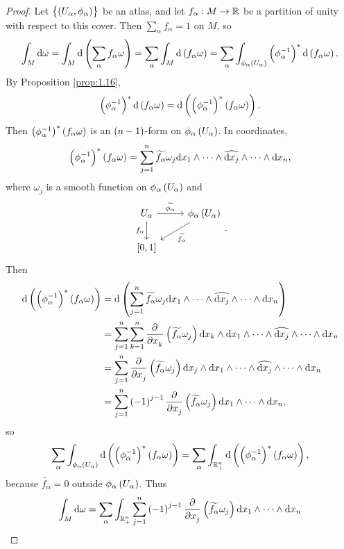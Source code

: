 \begin{proof}
Let $ \cbr{\br{U_\alpha, \phi_\alpha}} $ be an atlas, and let $ f_\alpha : M \to \mathbb{R} $ be a partition of unity with respect to this cover. Then $ \sum_\alpha f_\alpha = 1 $ on $ M $, so
$$ \int_M \d\omega = \int_M \d\br{\sum_\alpha f_\alpha\omega} = \sum_\alpha \int_M \d\br{f_\alpha\omega} = \sum_\alpha \int_{\phi_\alpha\br{U_\alpha}} \br{\phi_\alpha^{-1}}^*\d\br{f_\alpha\omega}. $$
By Proposition \ref{prop:1.16},
$$ \br{\phi_\alpha^{-1}}^*\d\br{f_\alpha\omega} = \d\br{\br{\phi_\alpha^{-1}}^*\br{f_\alpha\omega}}. $$
Then $ \br{\phi_\alpha^{-1}}^*\br{f_\alpha\omega} $ is an $ \br{n - 1} $-form on $ \phi_\alpha\br{U_\alpha} $. In coordinates,
$$ \br{\phi_\alpha^{-1}}^*\br{f_\alpha\omega} = \sum_{j = 1}^n \widetilde{f_\alpha}\omega_j\d x_1 \wedge \dots \wedge \widehat{\d x_j} \wedge \dots \wedge \d x_n, $$
where $ \omega_j $ is a smooth function on $ \phi_\alpha\br{U_\alpha} $ and
$$
\begin{tikzcd}
U_\alpha \arrow{r}{\widetilde{\phi_\alpha}} \arrow[swap]{d}{f_\alpha} & \phi_\alpha\br{U_\alpha} \arrow{dl}{\widetilde{f_\alpha}} \\
\sbr{0, 1} &
\end{tikzcd}.
$$
Then
\begin{align*}
\d\br{\br{\phi_\alpha^{-1}}^*\br{f_\alpha\omega}}
& = \d\br{\sum_{j = 1}^n \widetilde{f_\alpha}\omega_j\d x_1 \wedge \dots \wedge \widehat{\d x_j} \wedge \dots \wedge \d x_n} \\
& = \sum_{j = 1}^n \sum_{k = 1}^n \dpd{}{x_k}\br{\widetilde{f_\alpha}\omega_j}\d x_k \wedge \d x_1 \wedge \dots \wedge \widehat{\d x_j} \wedge \dots \wedge \d x_n \\
& = \sum_{j = 1}^n \dpd{}{x_j}\br{\widetilde{f_\alpha}\omega_j}\d x_j \wedge \d x_1 \wedge \dots \wedge \widehat{\d x_j} \wedge \dots \wedge \d x_n \\
& = \sum_{j = 1}^n \br{-1}^{j - 1}\dpd{}{x_j}\br{\widetilde{f_\alpha}\omega_j}\d x_1 \wedge \dots \wedge \d x_n,
\end{align*}
so
$$ \sum_\alpha \int_{\phi_\alpha\br{U_\alpha}} \d\br{\br{\phi_\alpha^{-1}}^*\br{f_\alpha\omega}} = \sum_\alpha \int_{\RR_+^n} \d\br{\br{\phi_\alpha^{-1}}^*\br{f_\alpha\omega}}, $$
because $ \widetilde{f_\alpha} = 0 $ outside $ \phi_\alpha\br{U_\alpha} $. Thus
\begin{align*}
\int_M \d\omega
& = \sum_\alpha \int_{\RR_+^n} \sum_{j = 1}^n \br{-1}^{j - 1}\dpd{}{x_j}\br{\widetilde{f_\alpha}\omega_j}\d x_1 \wedge \dots \wedge \d x_n \\

\end{align*}
\end{proof}
